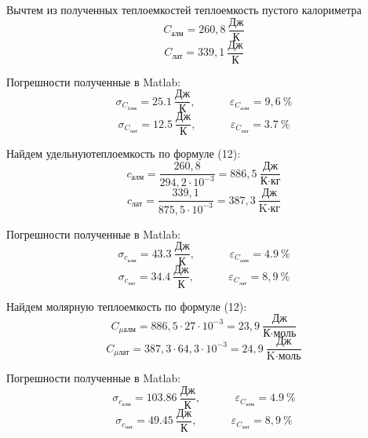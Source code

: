 Вычтем из полученных теплоемкостей теплоемкость пустого калориметра
\begin{equation}
	C_{\text{алм}} = 260,8\ \frac{\text{Дж}}{\text{К}}
\end{equation}
\begin{equation}
	C_{\text{лат}} = 339,1\ \frac{\text{Дж}}{\text{К}}
\end{equation}

Погрешности полученные в Matlab:
\begin{equation}
\sigma_{C_{\text{aлм}}} = 25.1\ \frac{\text{Дж}}{\text{К}}, ~~~~~~~~~~~~~~
\varepsilon_{C_{\text{алм}}} = 9,6\ \%
\end{equation}
\begin{equation}
\sigma_{C_{\text{лат}}} = 12.5\ \frac{\text{Дж}}{\text{К}}, ~~~~~~~~~~~~~~
\varepsilon_{C_{\text{лат}}} = 3.7\ \%
\end{equation}



Найдем удельнуютеплоемкость по формуле (12):
\begin{equation}
	c_{\text{алм}} = \frac{260,8}{294,2\cdot 10^{-3}} = 886,5\ \frac{\text{Дж}}{\text{К}\cdot \text{кг}}
\end{equation}
\begin{equation}
	c_{\text{лат}} = \frac{339,1}{875,5\cdot 10^{-3}} = 387,3\ \frac{\text{Дж}}{\text{K}\cdot \text{кг}}
\end{equation}

Погрешности полученные в Matlab:
\begin{equation}
\sigma_{c_{\text{алм}}} = 43.3\ \frac{\text{Дж}}{\text{К}}, ~~~~~~~~~~~~~~
\varepsilon_{C_{\text{алм}}} = 4.9\ \%
\end{equation}
\begin{equation}
\sigma_{c_{\text{лат}}} = 34.4\ \frac{\text{Дж}}{\text{К}}, ~~~~~~~~~~~~~~
\varepsilon_{C_{\text{лат}}} = 8,9\ \%
\end{equation}


Найдем молярную теплоемкость по формуле (12):
\begin{equation}
	C_{\mu \text{алм}} = 886,5\cdot 27\cdot 10^{-3}  = 23,9 \ \frac{\text{Дж}}{\text{К}\cdot \text{моль}}
\end{equation}
\begin{equation}
	C_{\mu \text{лат}} = 387,3\cdot 64,3\cdot 10^{-3} = 24,9 \ \frac{\text{Дж}}{\text{K}\cdot \text{моль}}
\end{equation}


Погрешности полученные в Matlab:
\begin{equation}
\sigma_{c_{\text{алм}}} = 103.86\ \frac{\text{Дж}}{\text{К}}, ~~~~~~~~~~~~~~
\varepsilon_{C_{\text{алм}}} = 4.9\ \%
\end{equation}
\begin{equation}
\sigma_{c_{\text{лат}}} = 49.45\ \frac{\text{Дж}}{\text{К}}, ~~~~~~~~~~~~~~
\varepsilon_{C_{\text{лат}}} = 8,9\ \%
\end{equation}


